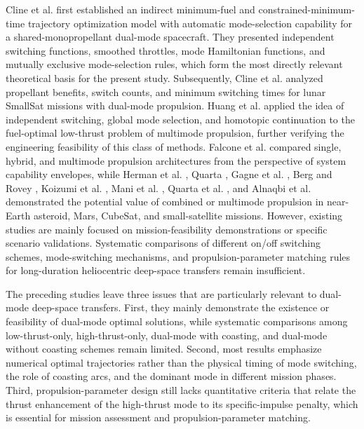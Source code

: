 \documentclass{IEEEtaes}
\begin{document}
Cline et al. \cite{cline2024a} first established an indirect minimum-fuel and constrained-minimum-time trajectory optimization model with automatic mode-selection capability for a shared-monopropellant dual-mode spacecraft. They presented independent switching functions, smoothed throttles, mode Hamiltonian functions, and mutually exclusive mode-selection rules, which form the most directly relevant theoretical basis for the present study. Subsequently, Cline et al. \cite{cline2024b} analyzed propellant benefits, switch counts, and minimum switching times for lunar SmallSat missions with dual-mode propulsion. Huang et al. \cite{huang2026} applied the idea of independent switching, global mode selection, and homotopic continuation to the fuel-optimal low-thrust problem of multimode propulsion, further verifying the engineering feasibility of this class of methods. Falcone et al. \cite{falcone2025} compared single, hybrid, and multimode propulsion architectures from the perspective of system capability envelopes, while Herman et al. \cite{herman2014}, Quarta \cite{quarta2024}, Gagne et al. \cite{gagne2018}, Berg and Rovey \cite{berg2017}, Koizumi et al. \cite{koizumi2016}, Mani et al. \cite{mani2019}, Quarta et al. \cite{quarta2025}, and Alnaqbi et al. \cite{alnaqbi2024} demonstrated the potential value of combined or multimode propulsion in near-Earth asteroid, Mars, CubeSat, and small-satellite missions. However, existing studies are mainly focused on mission-feasibility demonstrations or specific scenario validations. Systematic comparisons of different on/off switching schemes, mode-switching mechanisms, and propulsion-parameter matching rules for long-duration heliocentric deep-space transfers remain insufficient.

The preceding studies leave three issues that are particularly relevant to dual-mode deep-space transfers. First, they mainly demonstrate the existence or feasibility of dual-mode optimal solutions, while systematic comparisons among low-thrust-only, high-thrust-only, dual-mode with coasting, and dual-mode without coasting schemes remain limited. Second, most results emphasize numerical optimal trajectories rather than the physical timing of mode switching, the role of coasting arcs, and the dominant mode in different mission phases. Third, propulsion-parameter design still lacks quantitative criteria that relate the thrust enhancement of the high-thrust mode to its specific-impulse penalty, which is essential for mission assessment and propulsion-parameter matching.
\end{document}

